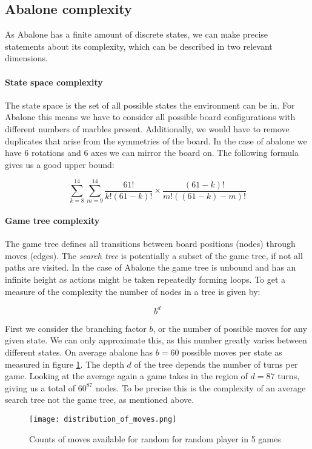 \subsection{Abalone complexity}

As Abalone has a finite amount of discrete states, we can make precise statements about its complexity, which can be described in two relevant dimensions.

\paragraph{State space complexity}
The state space is the set of all possible states the environment can be in.\cite[p. 150]{russell_artificial_2021} For Abalone this means we have to consider all possible board configurations with different numbers of marbles present. Additionally, we would have to remove duplicates that arise from the symmetries of the board. In the case of abalone we have 6 rotations and 6 axes we can mirror the board on. The following formula gives us a good upper bound:

$$
    \sum_{k=8}^{14}\sum_{m=9}^{14}\frac{61!}{k!(61-k)!}\times\frac{(61-k)!}{m!((61-k)-m)!}
$$

\paragraph{Game tree complexity} The game tree defines all transitions between board positions (nodes) through moves (edges). The \textit{search tree} is potentially a subset of the game tree, if not all paths are visited. In the case of Abalone the game tree is unbound and has an infinite height as actions might be taken repeatedly forming loops. To get a measure of the complexity the number of nodes in a tree is given by:

$$
    b^d
$$

First we consider the branching factor $ b $, or the number of possible moves for any given state. We can only approximate this, as this number greatly varies between different states. On average abalone has $ b = 60 $ possible moves per state as measured in figure \ref{branching_factor}. The depth $ d $ of the tree depends the number of turns per game. Looking at the average again a game takes in the region of $ d = 87 $ turns, giving us a total of $60^{87}$ nodes. To be precise this is the complexity of an average search tree not the game tree, as mentioned above. \cite{lemmens_constructing_2005}

\begin{figure}
    \centering
    \texttt{[image: distribution\_of\_moves.png]}
    \caption{Counts of moves available for random for random player in 5 games}
    \label{branching_factor}
\end{figure}

